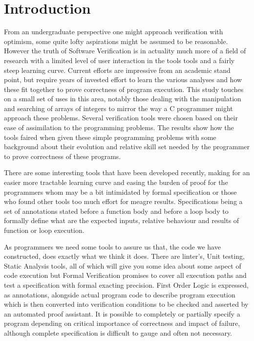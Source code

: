 \documentclass[10pt]{article} %
\begin{document}
\section{Introduction}
From an undergraduate perspective one might approach verification with optimism, some quite lofty aspirations might be assumed to be reasonable. However the truth of Software Verification is in actuality much more of a field of research with a limited level of user interaction in the tools tools and a fairly steep learning curve. Current efforts are impressive from an academic stand point, but require years of invested effort to learn the various analyses and how these fit together to prove correctness of program execution. This study touches on a small set of uses in this area, notably those dealing with the manipulation and searching of arrays of integers to mirror the way a C programmer might approach these problems. Several verification tools were chosen based on their ease of assimilation to the programming problems. The results show how the tools faired when given these simple programming problems with some background about their evolution and relative skill set needed by the programmer to prove correctness of these programs.

There are some interesting tools that have been developed recently, making for an easier more tractable learning curve and easing the burden of proof for the programmers whom may be a bit intimidated by formal specification or those who found other tools too much effort for meagre results. Specifications being a set of annotations stated before a function body and before a loop body to formally define what are the expected inputs, relative behaviour and results of function or loop execution.

As programmers we need some tools to assure us that, the code we have constructed, does exactly what we think it does. There are linter's, Unit testing, Static Analysis tools, all of which will give you some idea about some aspect of code execution but Formal Verification promises to cover all execution paths and test a specification with formal exacting precision. First Order Logic is expressed, as annotations, alongside actual program code to describe program execution which is then converted into verification conditions to be checked and asserted by an automated proof assistant. It is possible to completely or partially specify a program depending on critical importance of correctness and impact of failure, although complete specification is difficult to gauge and often not necessary.
\end{document}
